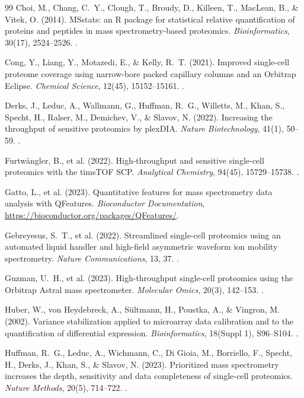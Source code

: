 \documentclass[11pt,twoside,openright]{book}
\begin{document}
\begin{thebibliography}{99}
Choi, M., Chang, C.~Y., Clough, T., Broudy, D., Killeen, T., MacLean, B., \& Vitek, O. (2014). MSstats: an R package for statistical relative quantification of proteins and peptides in mass spectrometry-based proteomics. \textit{Bioinformatics}, 30(17), 2524--2526. .

Cong, Y., Liang, Y., Motazedi, E., \& Kelly, R.~T. (2021). Improved single-cell proteome coverage using narrow-bore packed capillary columns and an Orbitrap Eclipse. \textit{Chemical Science}, 12(45), 15152--15161. .

Derks, J., Leduc, A., Wallmann, G., Huffman, R.~G., Willetts, M., Khan, S., Specht, H., Ralser, M., Demichev, V., \& Slavov, N. (2022). Increasing the throughput of sensitive proteomics by plexDIA. \textit{Nature Biotechnology}, 41(1), 50--59. .

Furtw\"angler, B., et al. (2022). High-throughput and sensitive single-cell proteomics with the timsTOF SCP. \textit{Analytical Chemistry}, 94(45), 15729--15738. .

Gatto, L., et al. (2023). Quantitative features for mass spectrometry data analysis with QFeatures. \textit{Bioconductor Documentation}, \url{https://bioconductor.org/packages/QFeatures/}.

Gebreyesus, S.~T., et al. (2022). Streamlined single-cell proteomics using an automated liquid handler and high-field asymmetric waveform ion mobility spectrometry. \textit{Nature Communications}, 13, 37. .

Guzman, U.~H., et al. (2023). High-throughput single-cell proteomics using the Orbitrap Astral mass spectrometer. \textit{Molecular Omics}, 20(3), 142--153. .

Huber, W., von Heydebreck, A., S\"ultmann, H., Poustka, A., \& Vingron, M. (2002). Variance stabilization applied to microarray data calibration and to the quantification of differential expression. \textit{Bioinformatics}, 18(Suppl 1), S96--S104. .

Huffman, R.~G., Leduc, A., Wichmann, C., Di Gioia, M., Borriello, F., Specht, H., Derks, J., Khan, S., \& Slavov, N. (2023). Prioritized mass spectrometry increases the depth, sensitivity and data completeness of single-cell proteomics. \textit{Nature Methods}, 20(5), 714--722. .


\end{thebibliography}
\end{document}
